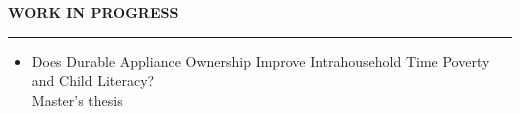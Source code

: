 \documentclass{resume} %
\def\sectionskip{\vspace{4pt}}
\def\sectionlineskip{\smallskip}
\renewenvironment{rSection}[1]{%
  \sectionskip
  \MakeUppercase{{\bf #1}}%
  \sectionlineskip
  \hrule
  \begin{list}{}{\setlength{\leftmargin}{0em}\setlength{\topsep}{5pt}\setlength{\itemsep}{0pt}\setlength{\parsep}{0pt}}%
  \item[]
}{%
  \end{list}
}
\begin{document}
\begin{rSection}{Work in Progress}
\raggedright
\begin{itemize}
\item Does Durable Appliance Ownership Improve Intrahousehold Time Poverty and Child Literacy?\\
{\small Master's thesis}
\end{itemize}
\end{rSection}
\end{document}
